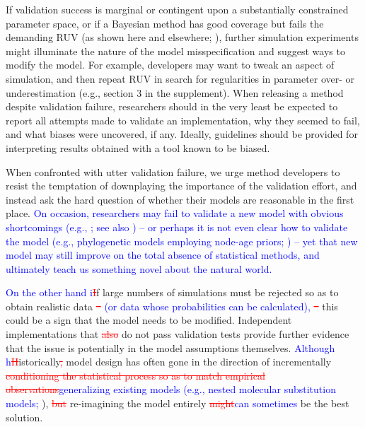 \documentclass[oneside]{article}
\begin{document}
If validation success is marginal or contingent upon a substantially constrained parameter space, or if a Bayesian method has good coverage but fails the demanding RUV (as shown here and elsewhere; \citealp{mchugh22}), further simulation experiments might illuminate the nature of the model misspecification and suggest ways to modify the model.
For example, developers may want to tweak an aspect of simulation, and then repeat RUV in search for regularities in parameter over- or underestimation (e.g., section 3 in the supplement).
When releasing a method despite validation failure, researchers should in the very least be expected to report all attempts made to validate an implementation, why they seemed to fail, and what biases were uncovered, if any.
Ideally, guidelines should be provided for interpreting results obtained with a tool known to be biased.

When confronted with utter validation failure, we urge method developers to resist the temptation of downplaying the importance of the validation effort, and instead ask the hard question of whether their models are reasonable in the first place.
\textcolor{blue}{On occasion, researchers may fail to validate a new model with obvious shortcomings (e.g., }\citealp{ree08}\textcolor{blue}{; see also }\citealp{ree09,goldberg11,matzke22}\textcolor{blue}{) -- or perhaps it is not even clear how to validate the model (e.g., phylogenetic models employing node-age priors; \citealp{ho09}) -- yet that new model may still improve on the total absence of statistical methods, and ultimately teach us something novel about the natural world.}

\textcolor{blue}{On the other hand i}\textcolor{red}{\st{I}}f large numbers of simulations must be rejected so as to obtain realistic data\textcolor{red}{\st{ -- }}\textcolor{blue}{(or data whose probabilities can be calculated), }\textcolor{red}{\st{ -- }}this could be a sign that the model needs to be modified. 
Independent implementations that \textcolor{red}{\st{also }}do not pass validation tests provide further evidence that the issue is potentially in the model assumptions themselves.
\textcolor{blue}{Although h}\textcolor{red}{\st{H}}istorically\textcolor{red}{\st{,}} model design has often gone in the direction of incrementally\textcolor{red}{\st{ conditioning the statistical process so as to match empirical observations}}\textcolor{blue}{generalizing existing models (e.g., nested molecular substitution models; }\citealp{fel04}), \textcolor{red}{\st{but }}re-imagining the model entirely \textcolor{red}{\st{might}}\textcolor{blue}{can sometimes} be the best solution.
\end{document}
